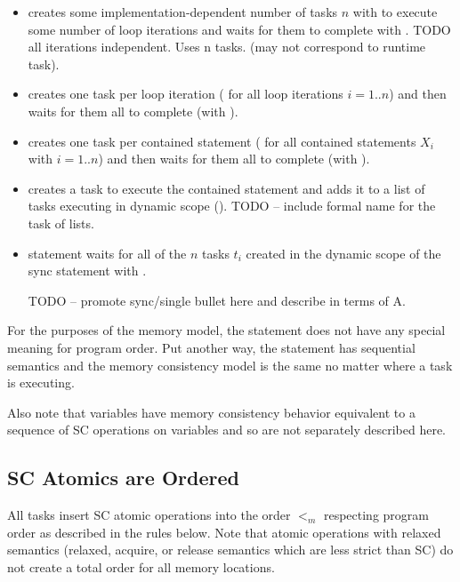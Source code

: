 \begin{itemize}

  \item {} creates some implementation-dependent number of tasks $n$
with  to execute some number of loop
iterations and waits for them to complete with .
TODO all iterations independent. Uses n tasks. (may not correspond to
runtime task).

  \item {} creates one task per loop iteration ( for all loop iterations $i=1..n$) and then waits for them
all to complete (with ).

  \item {} creates one task per contained statement ( for all contained statements $X_i$ with $i=1..n$) and then
waits for them all to complete (with ).

  \item {} creates a task to execute the contained statement and adds
it to a list of tasks executing in dynamic scope ().
TODO -- include formal name for the task of lists.

  \item {} statement waits for all of the $n$ tasks $t_i$ created in
the dynamic scope of the sync statement with .

TODO -- promote sync/single bullet here and describe in terms of A.

\end{itemize}

For the purposes of the memory model, the  statement does not have any
special meaning for program order. Put another way, the  statement has
sequential semantics and the memory consistency model is the same no matter
where a task is executing.

Also note that  variables have memory consistency behavior
equivalent to a sequence of SC operations on  variables and so are
not separately described here. 

\subsection{SC Atomics are Ordered}
\label{sc_atomics_ordered}

All tasks insert SC atomic operations into the order $<_m$ respecting
program order as described in the rules below. Note that atomic operations with
relaxed semantics (relaxed, acquire, or release semantics which are less strict
than SC) do not create a total order for all memory locations.

